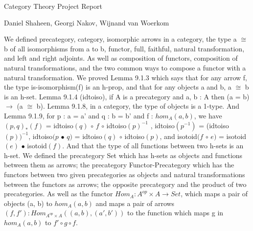 \documentclass[11pt]{article}
\begin{document}
\centerline{\sc Category Theory Project Report }

\vspace{.5pc}
\centerline{\sc Daniel Shaheen, Georgi Nakov, Wijnand van Woerkom}
\vspace{1pc}

We defined precategory, category, isomorphic arrows in a category, the type a $\cong$ b of all isomorphisms from a to b, functor, full, faithful, natural transformation, and left and right adjoints. As well as composition of functors, composition of natural transformations, and the two common ways to compose a functor with a natural transformation. We proved Lemma 9.1.3 which says that for any arrow f, the type is-isomorphism(f) is an h-prop, and that for any objects a and b, a $\cong$ b is an h-set. Lemma 9.1.4 (idtoiso), if A is a precategory and a, b : A then (a = b) $\rightarrow$ (a $\cong$ b). Lemma 9.1.8, in a category, the type of objects is a 1-type. And Lemma 9.1.9, for p : a = a' and q : b = b' and f : $hom_A(a, b)$, we have $(p, q)_*(f)$ = idtoiso$(q)$ $\circ$ $f$ $\circ$ idtoiso$(p)^{-1}$ , idtoiso$(p^{-1})$ = (idtoiso$(p))^{-1}$, idtoiso$(p$ $\bullet$ $q)$ = idtoiso$(q)$ $\circ$ idtoiso$(p)$, and isotoid$(f$ $\circ$ $e)$ = isotoid$(e)$ $\bullet$ isotoid$(f)$.
And that the type of all functions between two h-sets is an h-set. We defined the precategory Set which has h-sets as objects and functions between them as arrows; the precategory Functor-Precategory which has the functors between two given precategories as objects and natural transformations between the functors as arrows; the opposite precategory and the product of two precategories. As well as the functor $Hom_A : A^{op} \times A \rightarrow Set$, which maps a pair of objects (a, b) to $hom_A(a, b)$ and maps a pair of arrows $(f , f') : Hom_{A^{op} \times A} ((a, b), (a', b'))$ to the function which maps g in $hom_A(a, b)$ to $f' \circ g \circ f$.
\end{document}
